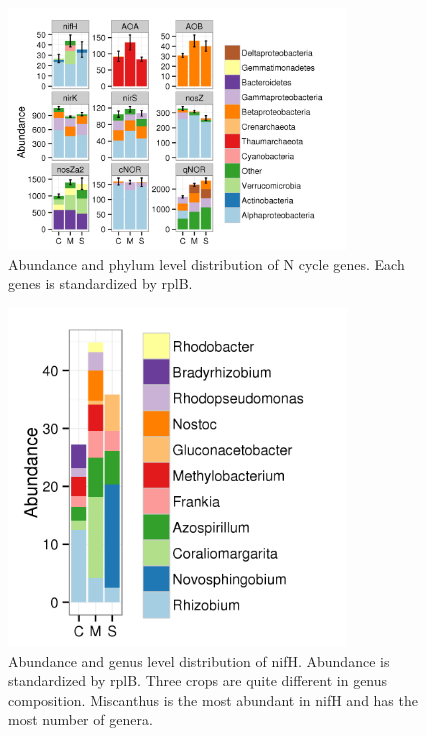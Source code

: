 \documentclass[12pt]{article}
\begin{document}
    \begin{figure}[tbph!]
    \centering
    \includegraphics[width=0.8\textwidth]{figures/xander-ncycle-abun}
    \caption[Abundance and phylum level distribution of N cycle genes]{Abundance and phylum level distribution of N cycle genes. Each genes is standardized by rplB.}
    \label{fig:xander-ncycle-abun}
    \end{figure}


    \begin{figure}[tbph!]
    \centering
    \includegraphics[width=0.8\textwidth]{figures/xander-nifH-genus}
    \caption[Abundance and genus level distribution of nifH]{Abundance and genus level distribution of nifH. Abundance is standardized by rplB. Three crops are quite different in genus composition. Miscanthus is the most abundant in nifH and has the most number of genera.}
    \label{fig:xander-nifH-genus}
    \end{figure}
\end{document}
